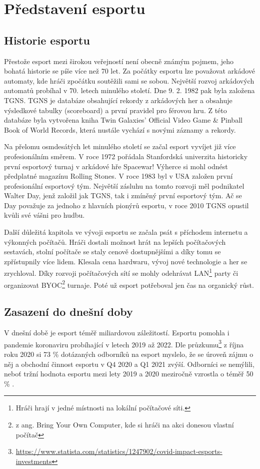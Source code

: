 \chapter{Představení esportu}
\section{Historie esportu}
Přestože esport mezi širokou veřejností není obecně známým pojmem, jeho bohatá historie se píše více než 70 let. Za počátky esportu lze považovat arkádové automaty, kde hráči
zpočátku soutěžili sami se sobou. Největší rozvoj arkádových automatů probíhal v 70. letech minulého století. Dne 9. 2. 1982 pak byla založena \ac{TGNS}. \ac{TGNS} je databáze
obsahující rekordy z arkádových her a obsahuje výsledkové tabulky (scoreboard) a první pravidel pro férovou hru. Z této databáze byla vytvořena kniha  Twin Galaxies' Official
Video Game \& Pinball Book of World Records, která nustále vychází s novými záznamy a rekordy.

Na přelomu osmdesátých let minulého století se začal esport vyvíjet již více profesionálním směrem. V roce 1972 pořádala Stanfordská univerzita historicky první
esportový turnaj v arkádové hře Spacewar! Výherce si mohl odnést předplatné magazínu Rolling Stones. V roce 1983 byl v USA založen první profesionální esportový tým. Největší
zásluhu na tomto rozvoji měl podnikatel Walter Day, jenž založil jak \ac{TGNS}, tak i zmíněný první esportový tým. Ač se Day považuje za jednoho z hlavních pionýrů esportu, v
roce 2010 \ac{TGNS} opustil kvůli své vášni pro hudbu.

Další důležitá kapitola ve vývoji esportu se začala psát s příchodem internetu a výkonných počítačů. Hráči dostali možnost hrát na lepších počítačových sestavách, stolní počítače
se staly cenově dostupnějšími a díky tomu se zpřístupnily více lidem. Klesala cena hardwaru, vývoj nové technologie a her se zrychloval. Díky rozvoji počítačových sítí se mohly
odehrávat LAN\footnote{Hráči hrají v jedné místnosti na lokální počítačové síti.} party či organizovat BYOC\footnote{z ang. Bring Your Own Computer, kde si hráči na akci donesou
vlastní počítač} turnaje. Poté už esport potřeboval jen čas na organický růst.

\section{Zasazení do dnešní doby}
V dnešní době je esport téměř miliardovou záležitostí. Esportu pomohla i pandemie koronaviru probíhající v letech 2019 až 2022.
Dle průzkumu\footnote{\url{https://www.statista.com/statistics/1247902/covid-impact-esports-investments}}
z října roku 2020 si 73 \% dotázaných odborníků na esport myslelo, že se úroveň zájmu o něj a obchodní činnost esportu v Q4 2020 a Q1 2021 zvýší. Odborníci se nemýlili,
neboť tržní hodnota esportu mezi lety 2019 a 2020 meziročně vzrostla o téměř 50 \% \cite{gough_global_2022}.

